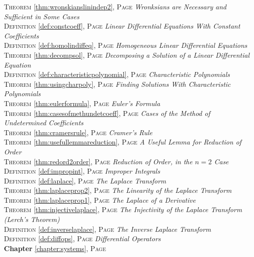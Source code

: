 \begin{multicols}{2}
{\textsc{Theorem} \ref{thm:wronskianslinindep2}, \textsc{Page} \pageref{thm:wronskianslinindep2} \textit{Wronksians are Necessary and Sufficient in Some Cases} \\
\textsc{Definition} \ref{def:constcoeff}, \textsc{Page} \pageref{def:constcoeff} \textit{Linear Differential Equations With Constant Coefficients} \\
\textsc{Definition} \ref{def:homolindiffeq}, \textsc{Page} \pageref{def:homolindiffeq} \textit{Homogeneous Linear Differential Equations} \\
\textsc{Theorem} \ref{thm:decompsol}, \textsc{Page} \pageref{thm:decompsol} \textit{Decomposing a Solution of a Linear Differential Equation} \\
\textsc{Definition} \ref{def:characteristicpolynomial}, \textsc{Page} \pageref{def:characteristicpolynomial} \textit{Characteristic Polynomials} \\
\textsc{Theorem} \ref{thm:usingcharpoly}, \textsc{Page} \pageref{thm:usingcharpoly} \textit{Finding Solutions With Characteristic Polynomials} \\
\textsc{Theorem} \ref{thm:eulerformula}, \textsc{Page} \pageref{thm:eulerformula} \textit{Euler's Formula} \\
\textsc{Theorem} \ref{thm:casesofmethundetcoeff}, \textsc{Page} \pageref{thm:casesofmethundetcoeff} \textit{Cases of the Method of Undetermined Coefficients} \\
\textsc{Theorem} \ref{thm:cramersrule}, \textsc{Page} \pageref{thm:cramersrule} \textit{Cramer's Rule} \\
\textsc{Theorem} \ref{thm:usefullemmareduction}, \textsc{Page} \pageref{thm:usefullemmareduction} \textit{A Useful Lemma for Reduction of Order} \\
\textsc{Theorem} \ref{thm:redord2order}, \textsc{Page} \pageref{thm:redord2order} \textit{Reduction of Order, in the \(n=2\) Case} \\
\textsc{Definition} \ref{def:impropint}, \textsc{Page} \pageref{def:impropint} \textit{Improper Integrals} \\
\textsc{Definition} \ref{def:laplace}, \textsc{Page} \pageref{def:laplace} \textit{The Laplace Transform} \\
\textsc{Theorem} \ref{thm:laplaceprop2}, \textsc{Page} \pageref{thm:laplaceprop2} \textit{The Linearity of the Laplace Transform} \\
\textsc{Theorem} \ref{thm:laplaceprop1}, \textsc{Page} \pageref{thm:laplaceprop1} \textit{The Laplace of a Derivative} \\
\textsc{Theorem} \ref{thm:injectivelaplace}, \textsc{Page} \pageref{thm:injectivelaplace} \textit{The Injectivity of the Laplace Transform (Lerch's Theorem)} \\
\textsc{Definition} \ref{def:inverselaplace}, \textsc{Page} \pageref{def:inverselaplace} \textit{The Inverse Laplace Transform} \\
\textsc{Definition} \ref{def:diffops}, \textsc{Page} \pageref{def:diffops} \textit{Differential Operators} \\
\textbf{Chapter} \ref{chapter:systems}, \textsc{Page} \pageref{chapter:systems} \\

      }
\end{multicols}

